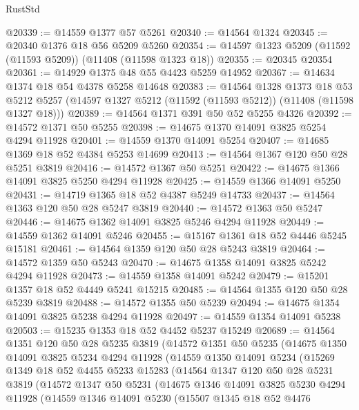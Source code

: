 \begin{lexlean}{RustStd}
\begin{coremodule}
@20339 := @14559 @1377 @57 @5261
@20340 := @14564 @1324
@20345 := @20340 @1376 @18 @56 @5209 @5260
@20354 := @14597 @1323 @5209 (@11592 (@11593 @5209)) (@11408 (@11598 @1323 @18))
@20355 := @20345 @20354
@20361 := @14929 @1375 @48 @55 @4423 @5259 @14952
@20367 := @14634 @1374 @18 @54 @4378 @5258 @14648
@20383 := @14564
    @1328
    @1373
    @18
    @53
    @5212
    @5257
    (@14597 @1327 @5212 (@11592 (@11593 @5212)) (@11408 (@11598 @1327 @18)))
@20389 := @14564 @1371 @391 @50 @52 @5255 @4326
@20392 := @14572 @1371 @50 @5255
@20398 := @14675 @1370 @14091 @3825 @5254 @4294 @11928
@20401 := @14559 @1370 @14091 @5254
@20407 := @14685 @1369 @18 @52 @4384 @5253 @14699
@20413 := @14564 @1367 @120 @50 @28 @5251 @3819
@20416 := @14572 @1367 @50 @5251
@20422 := @14675 @1366 @14091 @3825 @5250 @4294 @11928
@20425 := @14559 @1366 @14091 @5250
@20431 := @14719 @1365 @18 @52 @4387 @5249 @14733
@20437 := @14564 @1363 @120 @50 @28 @5247 @3819
@20440 := @14572 @1363 @50 @5247
@20446 := @14675 @1362 @14091 @3825 @5246 @4294 @11928
@20449 := @14559 @1362 @14091 @5246
@20455 := @15167 @1361 @18 @52 @4446 @5245 @15181
@20461 := @14564 @1359 @120 @50 @28 @5243 @3819
@20464 := @14572 @1359 @50 @5243
@20470 := @14675 @1358 @14091 @3825 @5242 @4294 @11928
@20473 := @14559 @1358 @14091 @5242
@20479 := @15201 @1357 @18 @52 @4449 @5241 @15215
@20485 := @14564 @1355 @120 @50 @28 @5239 @3819
@20488 := @14572 @1355 @50 @5239
@20494 := @14675 @1354 @14091 @3825 @5238 @4294 @11928
@20497 := @14559 @1354 @14091 @5238
@20503 := @15235 @1353 @18 @52 @4452 @5237 @15249
@20689 := @14564
    @1351
    @120
    @50
    @28
    @5235
    @3819
    (@14572
      @1351
      @50
      @5235
      (@14675
        @1350
        @14091
        @3825
        @5234
        @4294
        @11928
        (@14559
          @1350
          @14091
          @5234
          (@15269
            @1349
            @18
            @52
            @4455
            @5233
            @15283
            (@14564
              @1347
              @120
              @50
              @28
              @5231
              @3819
              (@14572
                @1347
                @50
                @5231
                (@14675
                  @1346
                  @14091
                  @3825
                  @5230
                  @4294
                  @11928
                  (@14559
                    @1346
                    @14091
                    @5230
                    (@15507
                      @1345
                      @18
                      @52
                      @4476

\end{coremodule}
\end{lexlean}
